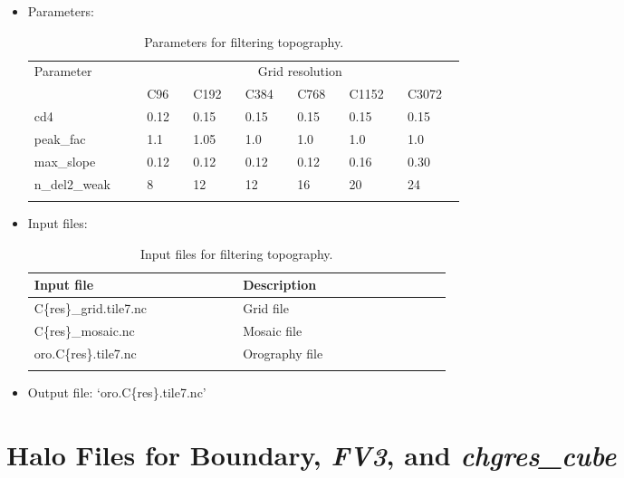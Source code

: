 \documentclass[11pt,fleqn]{report}              %
\begin{document}
\begin{itemize}
\item Parameters:
{
\fontsize{10}{12}\selectfont
\begin{longtable}{p{0.15\linewidth} | p{0.07\linewidth} | p{0.07\linewidth} | p{0.07\linewidth} | p{0.07\linewidth} | p{0.07\linewidth} | p{0.07\linewidth} }
\hline
\hline
 \multirow{2}{*}{Parameter} & \multicolumn{6}{c}{Grid resolution} \\
 \cline{2-7}
 & C96 & C192 & C384 & C768 & C1152 & C3072 \\
\hline
 cd4 & 0.12 & 0.15 & 0.15 & 0.15 & 0.15 & 0.15 \\
 peak\_fac & 1.1 & 1.05 & 1.0 & 1.0 & 1.0 & 1.0 \\
 max\_slope & 0.12 & 0.12 & 0.12 & 0.12 & 0.16 & 0.30  \\
 n\_del2\_weak & 8 & 12 & 12 & 16 & 20 & 24 \\
\hline
\caption{Parameters for filtering topography.}
\label{table:parm_topo_filt}
\end{longtable}
}

\item Input files:
{
\fontsize{10}{12}\selectfont
\begin{longtable}{ p{0.3\linewidth} | p{0.3\linewidth} }
\hline
\hline
 Input file & Description \\
\hline
 C\{res\}\_grid.tile7.nc & Grid file \\
 C\{res\}\_mosaic.nc & Mosaic file \\
 oro.C\{res\}.tile7.nc & Orography file \\
\hline
\caption{Input files for filtering topography.}
\label{table:var_filt_input}
\end{longtable}
}

\item Output file: `oro.C\{res\}.tile7.nc'

\end{itemize}



\section{Halo Files for Boundary, {\it FV3}, and {\it chgres\_cube}}
\label{sec:sar_pre_halo}
\end{document}
